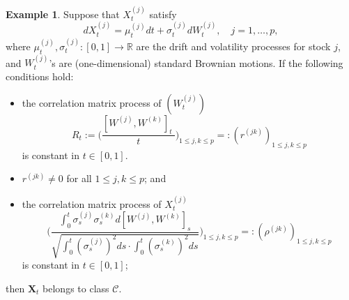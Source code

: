 \documentclass[a4paper,11pt]{article}
\theoremstyle{plain}
\theoremstyle{definition}
\newtheorem{exmp}[thm]{Example}
\newcommand{\MR}{\mathbb{R}}
\begin{document}
    \begin{exmp}
    	Suppose that $X_t^{(j)}$ satisfy
    		\[ dX_t^{(j)} = \mu_t^{(j)} dt + \sigma_t^{(j)}dW_t^{(j)}, \quad j = 1, \dots, p, \]
    		where $\mu_t^{(j)}, \sigma_t^{(j)} : [0, 1] \rightarrow \MR$ are the drift and volatility processes for stock $j$, and $W_t^{(j)}$'s are (one-dimensional) standard Brownian motions. If the following conditions hold:
    		\begin{itemize}
    			\item the correlation matrix process of $(W_t^{(j)})$
    			\[ R_t:= \bigg(\frac{ [W^{(j)}, W^{(k)}]_t \ }{t}\bigg)_{1 \leq j,k \leq p} =:(r^{(jk)})_{1 \leq j,k \leq p} \]
    			is constant in $t \in [0, 1]$.
    			\item $r^{(jk)} \neq 0$ for all $1 \leq j,k \leq p$; and
    			\item the correlation matrix process of $X_t^{(j)}$
    			\[ \Bigg( \frac{\int_{0}^{t} \sigma_s^{(j)}\sigma_s^{(k)} d[W^{(j)}, W^{(k)}]_s }{\sqrt{\int_{0}^{t} (\sigma_s^{(j)})^2 ds \cdot \int_{0}^{t} (\sigma_s^{(k)})^2 ds}} \Bigg)_{1 \leq j,k \leq p}  =:(\rho^{(jk)})_{1 \leq j,k \leq p}  \]
    			is constant in $t \in [0, 1]$;
    		\end{itemize}
    		then $\mathbf{X}_t$ belongs to class $\mathcal{C}$.
    		

\end{exmp}
\end{document}
